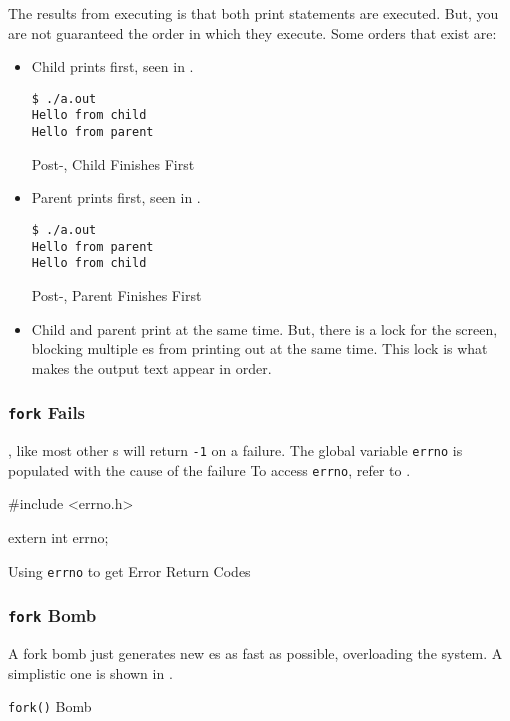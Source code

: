 The results from  executing is that both print statements are executed.
But, you are not guaranteed the order in which they execute.
Some orders that exist are:
\begin{itemize}[noitemsep]
\item Child prints first, seen in .
  \begin{listing}[h!tbp]
\begin{verbatim}
$ ./a.out
Hello from child
Hello from parent
\end{verbatim}
\caption{Post-, Child Finishes First}
\label{lst:fork-1-Child_First}
  \end{listing}

\item Parent prints first, seen in .
  \begin{listing}[h!tbp]
\begin{verbatim}
$ ./a.out
Hello from parent
Hello from child
\end{verbatim}
\caption{Post-, Parent Finishes First}
\label{lst:fork-1-Parent_First}
  \end{listing}

\item Child and parent print at the same time.
  But, there is a lock for the screen, blocking multiple es from printing out at the same time.
  This lock is what makes the output text appear in order.
\end{itemize}

\subsubsection{\texttt{fork} Fails}\label{subsubsec:fork_Fails}
, like most other s will return \texttt{-1} on a failure.
The global variable \texttt{errno} is populated with the cause of the failure
To access \texttt{errno}, refer to .

\begin{listing}[h!tbp]
\begin{csource}
#include <errno.h>

extern int errno;
\end{csource}
\caption{Using \texttt{errno} to get Error Return Codes}
\label{lst:errno}
\end{listing}

\subsubsection{\texttt{fork} Bomb}\label{subsubsec:fork_Bomb}
A fork bomb just generates new es as fast as possible, overloading the system.
A simplistic one is shown in .

\begin{listing}[h!tbp]
\caption{\texttt{fork()} Bomb}
\label{lst:fork_Bomb}
\end{listing}

